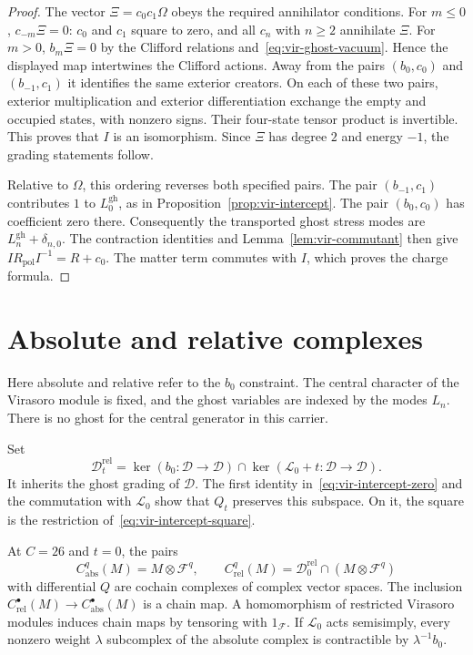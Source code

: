 \begin{proof}
The vector $\Xi=c_0c_1\Omega$ obeys the required annihilator conditions.
For $m\leq0$, $c_{-m}\Xi=0$: $c_0$ and $c_1$ square to zero, and all $c_n$ with $n\geq2$ annihilate $\Xi$.
For $m>0$, $b_m\Xi=0$ by the Clifford relations and~\eqref{eq:vir-ghost-vacuum}.
Hence the displayed map intertwines the Clifford actions.
Away from the pairs $(b_0,c_0)$ and $(b_{-1},c_1)$ it identifies the same exterior creators.
On each of these two pairs, exterior multiplication and exterior differentiation exchange the empty and occupied states, with nonzero signs.
Their four-state tensor product is invertible.
This proves that $I$ is an isomorphism.
Since $\Xi$ has degree $2$ and energy $-1$, the grading statements follow.

Relative to $\Omega$, this ordering reverses both specified pairs.
The pair $(b_{-1},c_1)$ contributes $1$ to $L_0^{\mathrm{gh}}$, as in Proposition~\ref{prop:vir-intercept}.
The pair $(b_0,c_0)$ has coefficient zero there.
Consequently the transported ghost stress modes are $L_n^{\mathrm{gh}}+\delta_{n,0}$.
The contraction identities and Lemma~\ref{lem:vir-commutant} then give
$I R_{\mathrm{pol}}I^{-1}=R+c_0$.
The matter term commutes with $I$, which proves the charge formula.
\end{proof}

\section{Absolute and relative complexes}

Here absolute and relative refer to the $b_0$ constraint.
The central character of the Virasoro module is fixed, and the ghost variables are indexed by the modes $L_n$.
There is no ghost for the central generator in this carrier.

Set
\[
 \mathcal D_t^{\mathrm{rel}}=
 \ker(b_0:\mathcal D\to\mathcal D)
 \cap\ker(\mathcal L_0+t:\mathcal D\to\mathcal D).
\]
It inherits the ghost grading of $\mathcal D$.
The first identity in~\eqref{eq:vir-intercept-zero} and the commutation with $\mathcal L_0$ show that $Q_t$ preserves this subspace.
On it, the square is the restriction of~\eqref{eq:vir-intercept-square}.

\begin{corollary}\label{cor:vir-complexes}
At $C=26$ and $t=0$, the pairs
\[
 C_{\mathrm{abs}}^q(M)=M\otimes\mathcal F^q,
 \qquad
 C_{\mathrm{rel}}^q(M)=\mathcal D_0^{\mathrm{rel}}\cap(M\otimes\mathcal F^q)
\]
with differential $Q$ are cochain complexes of complex vector spaces.
The inclusion $C_{\mathrm{rel}}^\bullet(M)\to C_{\mathrm{abs}}^\bullet(M)$ is a chain map.
A homomorphism of restricted Virasoro modules induces chain maps by tensoring with $1_{\mathcal F}$.
If $\mathcal L_0$ acts semisimply, every nonzero weight $\lambda$ subcomplex of the absolute complex is contractible by $\lambda^{-1}b_0$.
\end{corollary}


